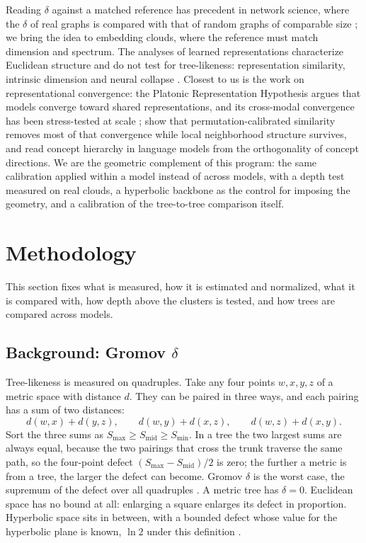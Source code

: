 \documentclass{article}
\theoremstyle{definition}
\theoremstyle{plain}
\theoremstyle{remark}
\begin{document}
Reading $\delta$ against a matched reference has precedent in network science, where the $\delta$ of real graphs is compared with that of random graphs of comparable size \citep{narayan2011curvature, kennedy2013hyperbolicity, adcock2013treelike}; we bring the idea to embedding clouds, where the reference must match dimension and spectrum. The analyses of learned representations characterize Euclidean structure and do not test for tree-likeness: representation similarity, intrinsic dimension and neural collapse \citep{kornblith2019cka, ansuini2019intrinsic, pope2021intrinsic, papyan2020prevalence}. Closest to us is the work on representational convergence: the Platonic Representation Hypothesis \citep{huh2024platonic} argues that models converge toward shared representations, and its cross-modal convergence has been stress-tested at scale \citep{koepke2026cave}; \citet{groger2026aristotelian} show that permutation-calibrated similarity removes most of that convergence while local neighborhood structure survives, and \citet{park2024geometry} read concept hierarchy in language models from the orthogonality of concept directions. We are the geometric complement of this program: the same calibration applied within a model instead of across models, with a depth test measured on real clouds, a hyperbolic backbone as the control for imposing the geometry, and a calibration of the tree-to-tree comparison itself.

\section{Methodology}
\label{sec:instrument}

This section fixes what is measured, how it is estimated and normalized, what it is compared with, how depth above the clusters is tested, and how trees are compared across models.

\subsection{Background: Gromov $\delta$}
\label{sec:v3-gromov}

Tree-likeness is measured on quadruples. Take any four points $w,x,y,z$ of a metric space with distance $d$. They can be paired in three ways, and each pairing has a sum of two distances:
\begin{equation}
d(w,x)+d(y,z),\qquad d(w,y)+d(x,z),\qquad d(w,z)+d(x,y).
\label{eq:pairings}
\end{equation}
Sort the three sums as $S_{\max}\ge S_{\mathrm{mid}}\ge S_{\min}$. In a tree the two largest sums are always equal, because the two pairings that cross the trunk traverse the same path, so the four-point defect $(S_{\max}-S_{\mathrm{mid}})/2$ is zero; the further a metric is from a tree, the larger the defect can become. Gromov $\delta$ is the worst case, the supremum of the defect over all quadruples \citep{Gromov1987}. A metric tree has $\delta=0$. Euclidean space has no bound at all: enlarging a square enlarges its defect in proportion. Hyperbolic space sits in between, with a bounded defect whose value for the hyperbolic plane is known, $\ln 2$ under this definition \citep{nica2016strong}.
\end{document}
